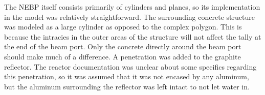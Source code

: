 The NEBP itself consists primarily of cylinders and planes, so its implementation in the model was relatively straightforward.
The surrounding concrete structure was modeled as a large cylinder as opposed to the complex polygon.
This is because the intracies in the outer areas of the structure will not affect the tally at the end of the beam port.
Only the concrete directly around the beam port should make much of a difference.
A penetration was added to the graphite reflector.
The reactor documentation was unclear about some specifics regarding this penetration, so it was assumed that it was not encased by any aluminum, but the aluminum surrounding the reflector was left intact to not let water in.





